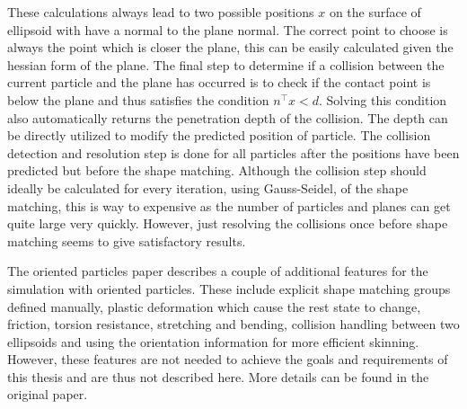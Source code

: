 These calculations always lead to two possible positions $x$ on the surface of ellipsoid with have a normal to the plane normal. The correct point to choose is always the point which is closer the plane, this can be easily calculated given the hessian form of the plane. The final step to determine if a collision between the current particle and the plane has occurred is to check if the contact point is below the plane and thus satisfies the condition $n^\top x < d$. Solving this condition also automatically returns the penetration depth of the collision. The depth can be directly utilized to modify the predicted position of particle. The collision detection and resolution step is done for all particles after the positions have been predicted but before the shape matching. Although the collision step should ideally be calculated for every iteration, using Gauss-Seidel, of the shape matching, this is way to expensive as the number of particles and planes can get quite large very quickly. However, just resolving the collisions once before shape matching seems to give satisfactory results.

The oriented particles paper describes a couple of additional features for the simulation with oriented particles. These include explicit shape matching groups defined manually, plastic deformation which cause the rest state to change, friction, torsion resistance, stretching and bending, collision handling between two ellipsoids and using the orientation information for more efficient skinning. However, these features are not needed to achieve the goals and requirements of this thesis and are thus not described here. More details can be found in the original paper.